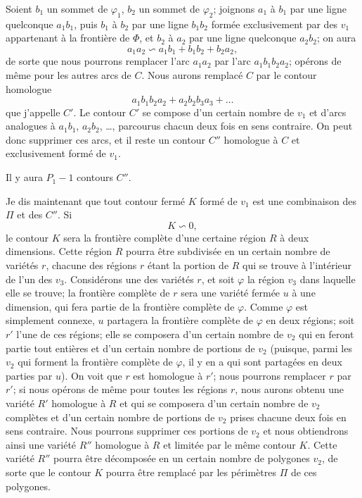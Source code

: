 \documentclass{article}
\begin{document}
Soient $b_{1}$ un sommet de $\varphi_{1}$, $b_{2}$ un sommet de $\varphi_{2}$; joignons $a_{1}$ à $b_{1}$ par
une ligne quelconque $a_{1}b_{1}$, puis $b_{1}$ à $b_{2}$ par une ligne $b_{1}b_{2}$ formée exclusivement par des $v_{1}$ appartenant à la frontière de $\Phi$, et $b_{2}$ à $a_{2}$ par une ligne quelconque $a_{2}b_{2}$; on aura
\[ a_{1}a_{2} \backsim a_{1}b_{1} + b_{1}b_{2} + b_{2}a_{2}, \]
de sorte que nous pourrons remplacer l'arc $a_{1}a_{2}$ par l'arc $a_{1}b_{1}b_{2}a_{2}$; opérons de même pour les autres arcs de $C$. Nous aurons remplacé $C$ par le contour homologue
\[ a_{1}b_{1}b_{2}a_{2} + a_{2}b_{2}b_{3}a_{3} + \ldots \]
que j'appelle $C'$. Le contour $C'$ se compose d'un certain nombre de $v_{1}$ et d'arcs analogues à $a_{1}b_{1}$, $a_{2}b_{2}$, \ldots, parcourus chacun deux fois en sens contraire. On peut donc supprimer ces arcs, et il reste un contour $C''$ homologue à $C$ et exclusivement formé de $v_{1}$.

Il y aura $P_{1} - 1$ contours $C''$.

Je dis maintenant que tout contour fermé $K$ formé de $v_{1}$ est une combinaison des $\Pi$ et des $C''$. Si
\[ K \backsim 0, \]
le contour $K$ sera la frontière complète d'une certaine région $R$ à deux dimensions. Cette région $R$ pourra être subdivisée en un certain nombre de variétés $r$, chacune des régions $r$ étant la portion de $R$ qui se trouve à l'intérieur de l'un des $v_{3}$. Considérons une des variétés $r$, et soit $\varphi$ la région $v_{3}$ dans laquelle elle se trouve; la frontière complète de $r$ sera une variété fermée $u$ à une dimension, qui fera partie de la frontière complète de $\varphi$. Comme $\varphi$ est simplement connexe, $u$ partagera la frontière complète de $\varphi$ en deux régions; soit $r'$ l'une de ces régions; elle se composera d'un certain nombre de $v_{2}$ qui en feront partie tout entières et d'un certain nombre de portions de $v_{2}$ (puisque, parmi les $v_{2}$ qui forment la frontière complète de $\varphi$, il y en a qui sont partagées en deux parties par $u$). On voit que $r$ est homologue à $r'$; nous pourrons remplacer $r$ par $r'$; si nous opérons de même pour toutes les régions $r$, nous aurons obtenu une variété
$R'$ homologue à $R$ et qui se composera d'un certain nombre de $v_{2}$ complètes et d'un certain nombre de portions de $v_{2}$ prises chacune deux fois en sens contraire. Nous pourrons supprimer ces portions de $v_{2}$ et nous obtiendrons ainsi une variété $R''$ homologue à $R$ et limitée par le même contour $K$. Cette variété $R''$ pourra être décomposée en un certain nombre de polygones $v_{2}$, de sorte que le contour $K$ pourra être remplacé par les périmètres $\Pi$ de ces polygones.
\end{document}

